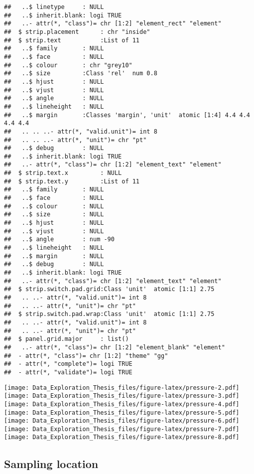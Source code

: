 \documentclass[]{article}
\begin{document}
\begin{verbatim}
##   ..$ linetype     : NULL
##   ..$ inherit.blank: logi TRUE
##   ..- attr(*, "class")= chr [1:2] "element_rect" "element"
##  $ strip.placement      : chr "inside"
##  $ strip.text           :List of 11
##   ..$ family       : NULL
##   ..$ face         : NULL
##   ..$ colour       : chr "grey10"
##   ..$ size         :Class 'rel'  num 0.8
##   ..$ hjust        : NULL
##   ..$ vjust        : NULL
##   ..$ angle        : NULL
##   ..$ lineheight   : NULL
##   ..$ margin       :Classes 'margin', 'unit'  atomic [1:4] 4.4 4.4 4.4 4.4
##   .. .. ..- attr(*, "valid.unit")= int 8
##   .. .. ..- attr(*, "unit")= chr "pt"
##   ..$ debug        : NULL
##   ..$ inherit.blank: logi TRUE
##   ..- attr(*, "class")= chr [1:2] "element_text" "element"
##  $ strip.text.x         : NULL
##  $ strip.text.y         :List of 11
##   ..$ family       : NULL
##   ..$ face         : NULL
##   ..$ colour       : NULL
##   ..$ size         : NULL
##   ..$ hjust        : NULL
##   ..$ vjust        : NULL
##   ..$ angle        : num -90
##   ..$ lineheight   : NULL
##   ..$ margin       : NULL
##   ..$ debug        : NULL
##   ..$ inherit.blank: logi TRUE
##   ..- attr(*, "class")= chr [1:2] "element_text" "element"
##  $ strip.switch.pad.grid:Class 'unit'  atomic [1:1] 2.75
##   .. ..- attr(*, "valid.unit")= int 8
##   .. ..- attr(*, "unit")= chr "pt"
##  $ strip.switch.pad.wrap:Class 'unit'  atomic [1:1] 2.75
##   .. ..- attr(*, "valid.unit")= int 8
##   .. ..- attr(*, "unit")= chr "pt"
##  $ panel.grid.major     : list()
##   ..- attr(*, "class")= chr [1:2] "element_blank" "element"
##  - attr(*, "class")= chr [1:2] "theme" "gg"
##  - attr(*, "complete")= logi TRUE
##  - attr(*, "validate")= logi TRUE
\end{verbatim}

\texttt{[image: Data\_Exploration\_Thesis\_files/figure-latex/pressure-2.pdf]}
\texttt{[image: Data\_Exploration\_Thesis\_files/figure-latex/pressure-3.pdf]}
\texttt{[image: Data\_Exploration\_Thesis\_files/figure-latex/pressure-4.pdf]}
\texttt{[image: Data\_Exploration\_Thesis\_files/figure-latex/pressure-5.pdf]}
\texttt{[image: Data\_Exploration\_Thesis\_files/figure-latex/pressure-6.pdf]}
\texttt{[image: Data\_Exploration\_Thesis\_files/figure-latex/pressure-7.pdf]}
\texttt{[image: Data\_Exploration\_Thesis\_files/figure-latex/pressure-8.pdf]}

\subsection{Sampling location}\label{sampling-location}
\end{document}
